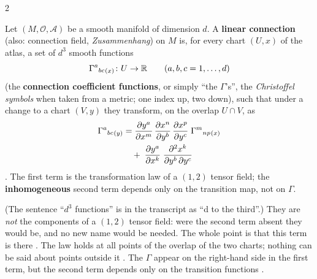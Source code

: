 \begin{paracol}{2}
\begin{definition}\label{def:cf-connection}
Let $(M,\mathcal O,\mathcal A)$ be a smooth manifold of dimension $d$. A \textbf{linear connection} (also: connection field,
\emph{Zusammenhang}) on $M$ is, for every chart $(U,x)$ of the atlas, a set of $d^3$ smooth functions
\[
  \Gamma^a{}_{bc}{}_{(x)}\colon U\to\mathbb{R}\qquad(a,b,c=1,\dots,d)
\]
(the \textbf{connection coefficient functions}, or simply ``the $\Gamma$'s'', the \emph{Christoffel symbols} when taken from a metric;
one index up, two down), such that under a change to a chart $(V,y)$ they transform, on the overlap $U\cap V$, as
\begin{align}\label{eq:cf-gamma-trafo}
  \Gamma^a{}_{bc}{}_{(y)}
  &=\frac{\partial y^a}{\partial x^m}\,\frac{\partial x^n}{\partial y^b}\,\frac{\partial x^p}{\partial y^c}\;\Gamma^m{}_{np}{}_{(x)}\notag\\
  &\quad+\;\frac{\partial y^a}{\partial x^k}\;\frac{\partial^2x^k}{\partial y^b\,\partial y^c}
\end{align}
. The first term is the transformation law of a $(1,2)$ tensor field; the \textbf{inhomogeneous} second term
depends only on the transition map, not on $\Gamma$.
\end{definition}
(The sentence ``$d^3$ functions'' is in the transcript as ``d to the third''.)
They are \emph{not} the components of a $(1,2)$ tensor field: were the second term absent they would be, and no new name would be
needed. The whole point is that this term is there . The law holds at all points of the overlap of the two charts;
nothing can be said about points outside it .
The $\Gamma$ appear on the right-hand side in the first term, but the second term depends only on the transition functions
.


\end{paracol}

